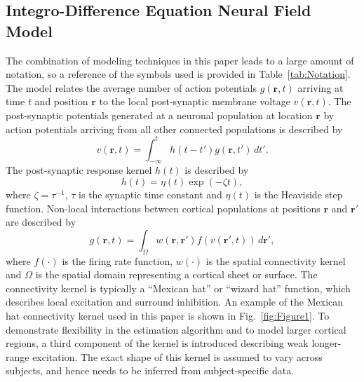 \documentclass[review,authoryear,3p]{elsarticle}
\begin{document}
\subsection{Integro-Difference Equation Neural Field Model}\label{IntegroDifferenceEquationSection} 
The combination of modeling techniques in this paper leads to a large amount of notation, so a reference of the symbols used is provided in Table~\ref{tab:Notation}. The model relates the average number of action potentials $g(\mathbf{r},t)$ arriving at time $t$ and position $\mathbf{r}$ to the local post-synaptic membrane voltage $v(\mathbf{r},t)$. The post-synaptic potentials generated at a neuronal population at location $\mathbf{r}$ by action potentials arriving from all other connected populations is described by 
\begin{equation}
	\label{SpikesToPotential} v\left( {\mathbf{r},t} \right) = \int_{ - \infty }^t {h\left( {t - t'} \right)g\left( {\mathbf{r},t'} \right) \, dt'}. 
\end{equation}
The post-synaptic response kernel $h(t)$ is described by 
\begin{equation}
	\label{SynapticRespKernel} h(t) = \eta(t)\exp{\left(-\zeta t\right)}, 
\end{equation}
where $\zeta=\tau^{-1}$, $\tau$ is the synaptic time constant and $\eta(t)$ is the Heaviside step function. Non-local interactions between cortical populations at positions $\mathbf{r}$ and $\mathbf{r}'$ are described by 
\begin{equation}
	\label{RateBasedInteractions} g\left( \mathbf{r},t \right) = \int_\Omega {w\left( \mathbf{r},\mathbf{r}' \right)f\left( v\left( \mathbf{r}',t \right) \right)\, d\mathbf{r}'}, 
\end{equation}
where $f(\cdot)$ is the firing rate function, $w(\cdot)$ is the spatial connectivity kernel and $\Omega$ is the spatial domain representing a cortical sheet or surface. The connectivity kernel is typically a ``Mexican hat'' or ``wizard hat'' function, which describes local excitation and surround inhibition. An example of the Mexican hat connectivity kernel used in this paper is shown in Fig.~\ref{fig:Figure1}. To demonstrate flexibility in the estimation algorithm and to model larger cortical regions, a third component of the kernel is introduced describing weak longer-range excitation. The exact shape of this kernel is assumed to vary across subjects, and hence needs to be inferred from subject-specific data.
\end{document}
